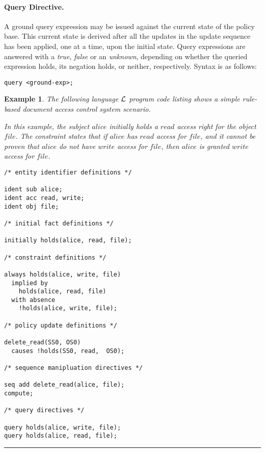 \documentclass[10pt, twocolumn]{article}
\newtheorem{examp}{Example}
\newenvironment{example}{\begin{examp}\rm}{\rule{2mm}{2mm}\end{examp}}
\begin{document}
        \paragraph{Query Directive.}

          A ground query expression may be issued against the current state of
          the policy base. This current state is derived after all the updates
          in the update sequence has been applied, one at a time, upon the
          initial state. Query expressions are answered with a \emph{true},
          \emph{false} or an \emph{unknown}, depending on whether the queried
          expression holds, its negation holds, or neither, respectively.
          Syntax is as follows:

          \begin{verbatim}query <ground-exp>;\end{verbatim} 

        \begin{example}
          The following language ${\cal L}$ program code listing shows a simple
          rule-based document access control system scenario.

          In this example, the subject $alice$ initially holds a $read$ access
          right for the object $file$. The constraint states that if $alice$
          has $read$ access for $file$, and it cannot be proven that $alice$ do
          not have $write$ access for $file$, then $alice$ is granted $write$
          access for $file$.

          \begin{verbatim}
/* entity identifier definitions */

ident sub alice;
ident acc read, write;
ident obj file;

/* initial fact definitions */

initially holds(alice, read, file);

/* constraint definitions */

always holds(alice, write, file) 
  implied by
    holds(alice, read, file)
  with absence
    !holds(alice, write, file);

/* policy update definitions */

delete_read(SS0, OS0)
  causes !holds(SS0, read,  OS0);

/* sequence manipluation directives */

seq add delete_read(alice, file);
compute;

/* query directives */

query holds(alice, write, file);
query holds(alice, read, file);
          \end{verbatim}
        \end{example}
\end{document}
